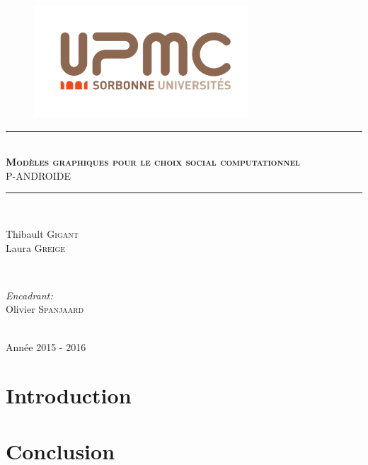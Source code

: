 \documentclass[11pt, letterpaper]{article}
\newcommand{\hmark}{\rule{\linewidth}{0.5mm}}
\begin{document}
\begin{titlepage}

\centering

\begin{figure}[t]
\begin{center}
\includegraphics[width=8cm]{upmc.png}
\end{center}
\end{figure}

\hmark \\[0.5cm]
\textsc{\textbf{\Large Mod\`{e}les graphiques pour le choix social computationnel}} \\[0.5cm]
\textsc{P-ANDROIDE} \\[0.5cm]
\hmark \\[5cm]

\begin{minipage}{0.4\textwidth}
\begin{flushleft}
Thibault \textsc{Gigant}\\
Laura \textsc{Greige}
\end{flushleft}
\end{minipage}
~
\begin{minipage}{0.4\textwidth}
\begin{flushright} \large
\emph{Encadrant:}\\
Olivier \textsc{Spanjaard}
\end{flushright}
\end{minipage}\\[4cm]

\large Ann\'{e}e 2015 - 2016

\end{titlepage}
\newpage

\tableofcontents

\newpage


\pagestyle{fancy}
\renewcommand{\headrulewidth}{1pt}

\section*{Introduction}

\newpage

\section*{Conclusion}
\end{document}
